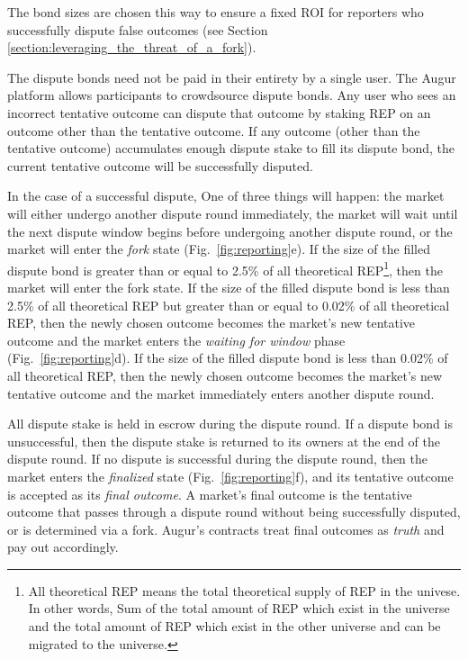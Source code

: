 \documentclass[floatfix,reprint,nofootinbib,amsmath,amssymb,epsfig,pre,floats,letterpaper,groupedaffiliation]{revtex4-1}
\theoremstyle{definition}
\theoremstyle{definition}
\begin{document}
The bond sizes are chosen this way to ensure a fixed ROI for reporters who successfully dispute false outcomes (see Section \ref{section:leveraging_the_threat_of_a_fork}).

The dispute bonds need not be paid in their entirety by a single user.  The Augur platform allows participants to crowdsource dispute bonds.  Any user who sees an incorrect tentative outcome can dispute that outcome by staking REP on an outcome other than the tentative outcome. If any outcome (other than the tentative outcome) accumulates enough dispute stake to fill its dispute bond, the current tentative outcome will be successfully disputed.

In the case of a successful dispute, One of three things will happen: the market will either undergo another dispute round immediately, the market will wait until the next dispute window begins before undergoing another dispute round, or the market will enter the \textit{fork} state (Fig.~\ref{fig:reporting}e).  If the size of the filled dispute bond is greater than or equal to 2.5\% of all theoretical REP\footnote{All theoretical REP means the total theoretical supply of REP in the univese. In other words, Sum of the total amount of REP which exist in the universe and the total amount of REP which exist in the other universe and can be migrated to the universe.}, then the market will enter the fork state. If the size of the filled dispute bond is less than 2.5\% of all theoretical REP but greater than or equal to 0.02\% of all theoretical REP, then the newly chosen outcome becomes the market's new tentative outcome and the market enters the \textit{waiting for window} phase (Fig.~\ref{fig:reporting}d). If the size of the filled dispute bond is less than 0.02\% of all theoretical REP, then the newly chosen outcome becomes the market's new tentative outcome and the market immediately enters another dispute round.

All dispute stake is held in escrow during the dispute round. If a dispute bond is unsuccessful, then the dispute stake is returned to its owners at the end of the dispute round. If no dispute is successful during the dispute round, then the market enters the \textit{finalized} state (Fig.~\ref{fig:reporting}f), and its tentative outcome is accepted as its \textit{final outcome}.  A market's final outcome is the tentative outcome that passes through a dispute round without being successfully disputed, or is determined via a fork.  Augur's contracts treat final outcomes as \textit{truth} and pay out accordingly.
\end{document}
